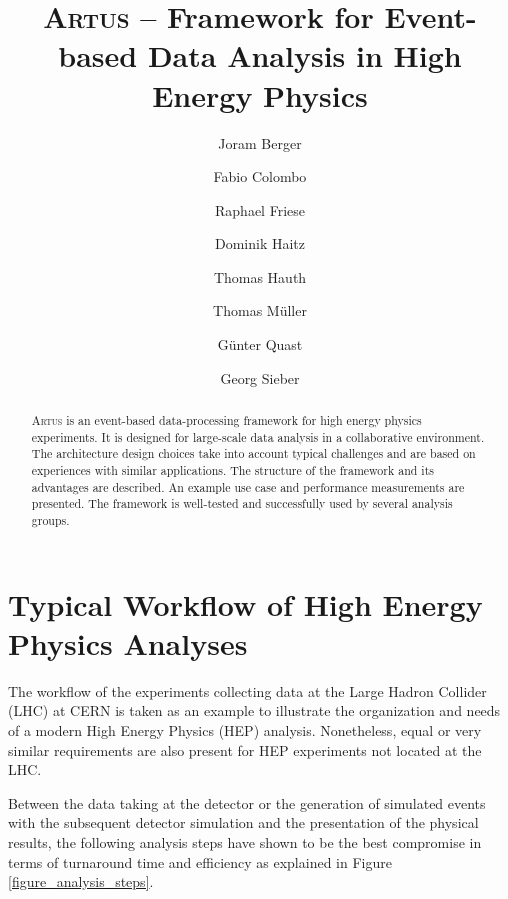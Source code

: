 \documentclass[3p]{elsarticle}
\newcommand{\software}[1]{\textsc{#1}\xspace}
\newcommand{\artus}{\software{Artus}}
\begin{document}
\begin{frontmatter}
\title{\artus{} -- Framework for Event-based Data Analysis in High Energy Physics}

\author{Joram Berger}
\author{Fabio Colombo}
\author{Raphael Friese}
\author{Dominik Haitz}
\author{Thomas Hauth}
\author{Thomas M\"uller}
\author{G\"unter Quast}
\author{Georg Sieber}
\address{Karlsruhe Institute of Technology, Wolfgang-Gaede-Stra\ss{}e 1, D-76131 Karlsruhe}

\begin{abstract}
\artus is an event-based data-processing framework for high energy physics experiments.
It is designed for large-scale data analysis in a collaborative environment.
The architecture design choices take into account typical challenges and are based on experiences with similar applications.
The structure of the framework and its advantages are described.
An example use case and performance measurements are presented.
The framework is well-tested and successfully used by several analysis groups.
\end{abstract}

\end{frontmatter}



\section{Typical Workflow of High Energy Physics Analyses}
\label{section_artus_analysis_workflow}
The workflow of the experiments collecting data at the Large Hadron Collider (LHC) at CERN is taken as an example to illustrate the organization and needs of a modern High Energy Physics (HEP) analysis.
Nonetheless, equal or very similar requirements are also present for HEP experiments not located at the LHC.

Between the data taking at the detector or the generation of simulated events with the subsequent detector simulation and the presentation of the physical results, the following analysis steps have shown to be the best compromise in terms of turnaround time and efficiency as explained in Figure \ref{figure_analysis_steps}.
\end{document}
